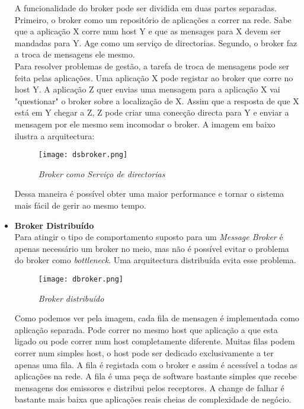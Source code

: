 \begin{itemize}
A funcionalidade do broker pode ser dividida em duas partes separadas. Primeiro, o broker como um repositório de aplicações a correr na rede. Sabe que a aplicação X corre num host Y e que as mensages para X devem ser mandadas para Y. Age como um serviço de directorias. Segundo, o broker faz a troca de mensagens ele mesmo.\\
Para resolver problemas de gestão, a tarefa de troca de mensagens pode ser feita pelas aplicações. Uma aplicação X pode registar ao broker que corre no host Y. A aplicação Z quer envias uma mensagem para a aplicação X vai "questionar" o broker sobre a localização de X. Assim que a resposta de que X está em Y chegar a Z, Z pode criar uma conecção directa para Y e enviar a mensagem por ele mesmo sem incomodar o broker. A imagem em baixo ilustra a arquitectura:\\
\begin{figure}[H]
\centering
\texttt{[image: dsbroker.png]}
\caption{\textit{Broker como Serviço de directorias}}
\label{fig:dsbroker}
\end{figure}
Dessa maneira é possível obter uma maior performance e tornar o sistema mais fácil de gerir ao mesmo tempo.
\item \textbf{Broker Distribuído}\\
Para atingir o tipo de comportamento suposto para um \textit{Message Broker} é apenas necessário um broker no meio, mas não é possível evitar o problema do broker como \textit{bottleneck}. Uma arquitectura distribuída evita esse problema.\\
\begin{figure}[H]
\centering
\texttt{[image: dbroker.png]}
\caption{\textit{Broker distribuído}}
\label{fig:distributedbroker}
\end{figure}
Como podemos ver pela imagem, cada fila de mensagen é implementada como aplicação separada. Pode correr no mesmo host que aplicação a que esta ligado ou pode correr num host completamente diferente. Muitas filas podem correr num simples host, o host pode ser dedicado exclusivamente a ter apenas uma fila. A fila é registada com o broker e assim é acessível a todas as aplicações na rede. A fila é uma peça de software bastante simples que recebe mensagens dos emissores e distribui pelos receptores. A change de falhar é bastante mais baixa que aplicações reais cheias de complexidade de negócio.
\end{itemize}


